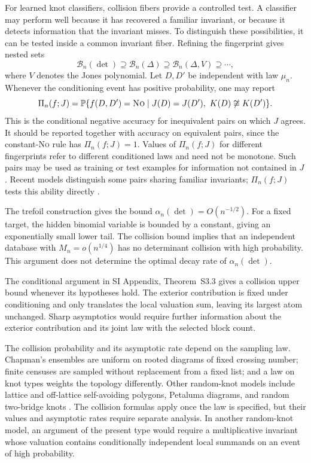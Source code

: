 \documentclass[9pt,twoside]{pnas-new}
\theoremstyle{definition}
\theoremstyle{remark}
\renewcommand{\Pr}{\mathbb{P}}
\newcommand{\SILocation}[1]{SI Appendix, #1}
\newcommand{\SIConditionalLocalBlock}{Theorem~S3.3}
\begin{document}
For learned knot classifiers, collision fibers provide a controlled test.  A classifier may perform well because it has recovered a familiar invariant, or because it detects information that the invariant misses.  To distinguish these possibilities, it can be tested inside a common invariant fiber.  Refining the fingerprint gives nested sets
\[
 \mathcal B_n(\det)
 \supseteq \mathcal B_n(\Delta)
 \supseteq \mathcal B_n(\Delta,V)
 \supseteq\cdots,
\]
where $V$ denotes the Jones polynomial.  Let $D,D'$ be independent with law $\mu_n$.  Whenever the conditioning event has positive probability, one may report
\[
 \Pi_n(f;J)=
 \Pr\{f(D,D')=\textsc{No}\mid J(D)=J(D'),\ K(D)\not\cong K(D')\}.
\]
This is the conditional negative accuracy for inequivalent pairs on which $J$ agrees.  It should be reported together with accuracy on equivalent pairs, since the constant-\textsc{No} rule has $\Pi_n(f;J)=1$.  Values of $\Pi_n(f;J)$ for different fingerprints refer to different conditioned laws and need not be monotone.  Such pairs may be used as training or test examples for information not contained in $J$.  Recent models distinguish some pairs sharing familiar invariants; $\Pi_n(f;J)$ tests this ability directly \cite{sleimanetal2024,halversonruehle2025}.

The trefoil construction gives the bound $\alpha_n(\det)=O(n^{-1/2})$. For a fixed target, the hidden binomial variable is bounded by a constant, giving an exponentially small lower tail. The collision bound implies that an independent database with $M_n=o(n^{1/4})$ has no determinant collision with high probability. This argument does not determine the optimal decay rate of $\alpha_n(\det)$.

The conditional argument in \SILocation{\SIConditionalLocalBlock{}} gives a collision upper bound whenever its hypotheses hold. The exterior contribution is fixed under conditioning and only translates the local valuation sum, leaving its largest atom unchanged. Sharp asymptotics would require further information about the exterior contribution and its joint law with the selected block count.

The collision probability and its asymptotic rate depend on the sampling law.  Chapman's ensembles are uniform on rooted diagrams of fixed crossing number; finite censuses are sampled without replacement from a fixed list; and a law on knot types weights the topology differently.  Other random-knot models include lattice and off-lattice self-avoiding polygons, Petaluma diagrams, and random two-bridge knots \cite{sumnerswhittington1988,pippenger1989,evenzoharetal2016,evenzoharetal2018,cohenetal2018,cantarellaetal2026}.  The collision formulas apply once the law is specified, but their values and asymptotic rates require separate analysis.  In another random-knot model, an argument of the present type would require a multiplicative invariant whose valuation contains conditionally independent local summands on an event of high probability.
\end{document}
